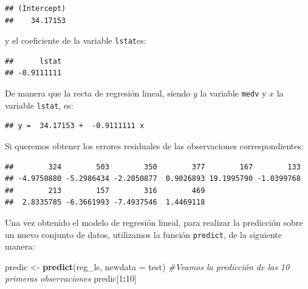 \documentclass[]{book}
\newenvironment{Shaded}{\begin{snugshade}}{\end{snugshade}}
\newcommand{\CommentTok}[1]{\textcolor[rgb]{0.56,0.35,0.01}{\textit{#1}}}
\newcommand{\DataTypeTok}[1]{\textcolor[rgb]{0.13,0.29,0.53}{#1}}
\newcommand{\DecValTok}[1]{\textcolor[rgb]{0.00,0.00,0.81}{#1}}
\newcommand{\KeywordTok}[1]{\textcolor[rgb]{0.13,0.29,0.53}{\textbf{#1}}}
\newcommand{\NormalTok}[1]{#1}
\newcommand{\OperatorTok}[1]{\textcolor[rgb]{0.81,0.36,0.00}{\textbf{#1}}}
\newcommand{\StringTok}[1]{\textcolor[rgb]{0.31,0.60,0.02}{#1}}
\begin{document}
\begin{verbatim}
## (Intercept) 
##    34.17153
\end{verbatim}

y el coeficiente de la variable \texttt{lstat}es:

\begin{Shaded}
\end{Shaded}

\begin{verbatim}
##      lstat 
## -0.9111111
\end{verbatim}

De manera que la recta de regresión lineal, siendo \(y\) la variable \texttt{medv} y \(x\) la variable \texttt{lstat}, es:

\begin{verbatim}
## y =  34.17153 +  -0.9111111 x
\end{verbatim}

Si queremos obtener los errores residuales de las observaciones correspondientes:

\begin{Shaded}
\end{Shaded}

\begin{verbatim}
##        324        503        350        377        167        133 
## -4.9750880 -5.2986434 -2.2050877  0.9026893 19.1995790 -1.0399768 
##        213        157        316        469 
##  2.8335785 -6.3661993 -7.4937546  1.4469118
\end{verbatim}

Una vez obtenido el modelo de regresión lineal, para realizar la predicción sobre un nuevo conjunto de datos, utilizamos la función \texttt{predict}, de la siguiente manera:

\begin{Shaded}
\begin{Highlighting}[]
\NormalTok{predic <-}\StringTok{ }\KeywordTok{predict}\NormalTok{(reg_ls, }\DataTypeTok{newdata =}\NormalTok{ test)}
\CommentTok{#Veamos la predicción de las 10 primeras observaciones}
\NormalTok{predic[}\DecValTok{1}\OperatorTok{:}\DecValTok{10}\NormalTok{]}
\end{Highlighting}
\end{Shaded}
\end{document}
